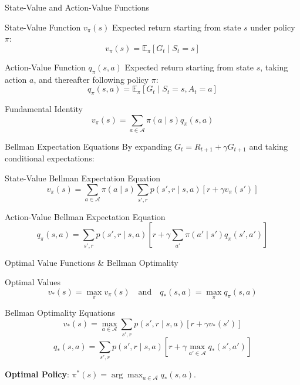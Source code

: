 \documentclass[10pt, aspectratio=169]{beamer}
\begin{document}
\begin{frame}{State-Value and Action-Value Functions}
  \begin{block}{State-Value Function $v_\pi(s)$}
    Expected return starting from state $s$ under policy $\pi$:
    $$v_\pi(s) = \mathbb{E}_\pi [G_t \mid S_t = s]$$
  \end{block}

  \begin{block}{Action-Value Function $q_\pi(s, a)$}
    Expected return starting from state $s$, taking action $a$, and thereafter following policy $\pi$:
    $$q_\pi(s, a) = \mathbb{E}_\pi [G_t \mid S_t = s, A_t = a]$$
  \end{block}

  \begin{block}{Fundamental Identity}
    $$v_\pi(s) = \sum_{a \in \mathcal{A}} \pi(a \mid s) q_\pi(s, a)$$
  \end{block}
\end{frame}

\begin{frame}{Bellman Expectation Equations}
  By expanding $G_t = R_{t+1} + \gamma G_{t+1}$ and taking conditional expectations:

  \begin{block}{State-Value Bellman Expectation Equation}
    $$v_\pi(s) = \sum_{a \in \mathcal{A}} \pi(a \mid s) \sum_{s', r} p(s', r \mid s, a) \left[ r + \gamma v_\pi(s') \right]$$
  \end{block}

  \begin{block}{Action-Value Bellman Expectation Equation}
    $$q_\pi(s, a) = \sum_{s', r} p(s', r \mid s, a) \left[ r + \gamma \sum_{a'} \pi(a' \mid s') q_\pi(s', a') \right]$$
  \end{block}
\end{frame}

\begin{frame}{Optimal Value Functions \& Bellman Optimality}
  \begin{block}{Optimal Values}
    $$v_*(s) = \max_\pi v_\pi(s) \quad \text{and} \quad q_*(s, a) = \max_\pi q_\pi(s, a)$$
  \end{block}

  \begin{block}{Bellman Optimality Equations}
    $$v_*(s) = \max_{a \in \mathcal{A}} \sum_{s', r} p(s', r \mid s, a) \left[ r + \gamma v_*(s') \right]$$
    $$q_*(s, a) = \sum_{s', r} p(s', r \mid s, a) \left[ r + \gamma \max_{a' \in \mathcal{A}} q_*(s', a') \right]$$
  \end{block}
  \textbf{Optimal Policy}: $\pi^*(s) = \arg\max_{a \in \mathcal{A}} q_*(s, a)$.
\end{frame}
\end{document}
